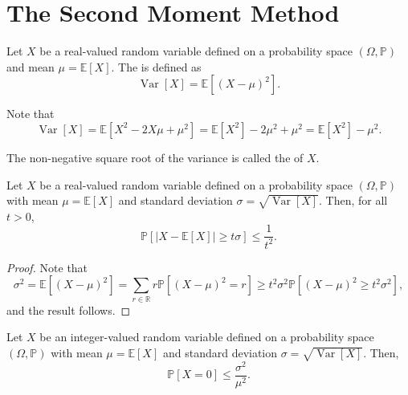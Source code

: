\section{The Second Moment Method}

\begin{definition}
    Let \(X\) be a real-valued random variable defined on a probability space \((\Omega, \mathbb{P})\) and mean \(\mu = \mathbb{E}[X]\).
    The  is defined as
    \begin{equation}
        \operatorname{Var}[X] = \mathbb{E}[(X - \mu)^2].
    \end{equation}
\end{definition}

Note that
\begin{equation}
    \operatorname{Var}[X] = \mathbb{E}[X^2 - 2X\mu + \mu^2] = \mathbb{E}[X^2] - 2\mu^2 + \mu^2 = \mathbb{E}[X^2] - \mu^2.
\end{equation}

The non-negative square root of the variance is called the  of \(X\).

\begin{lemma}
    Let \(X\) be a real-valued random variable defined on a probability space \((\Omega, \mathbb{P})\) with mean \(\mu = \mathbb{E}[X]\) and standard deviation \(\sigma = \sqrt{\operatorname{Var}[X]}\).
    Then, for all \(t > 0\),
    \begin{equation}
        \mathbb{P}[|X - \mathbb{E}[X]| \geq t\sigma] \leq \frac{1}{t^2}.
    \end{equation}
\end{lemma}

\begin{proof}
    Note that
    \begin{equation}
        \sigma^2
        = \mathbb{E}[(X - \mu)^2]
        = \sum_{r \in \mathbb{R}} r \mathbb{P}[(X - \mu)^2 = r]
        \geq t^2\sigma^2 \mathbb{P}[(X - \mu)^2 \geq t^2\sigma^2],
    \end{equation}
    and the result follows.
\end{proof}

\begin{corollary}
    Let \(X\) be an integer-valued random variable defined on a probability space \((\Omega, \mathbb{P})\) with mean \(\mu = \mathbb{E}[X]\) and standard deviation \(\sigma = \sqrt{\operatorname{Var}[X]}\).
    Then,
    \begin{equation}
        \mathbb{P}[X = 0] \leq \frac{\sigma^2}{\mu^2}.
    \end{equation}
\end{corollary}

